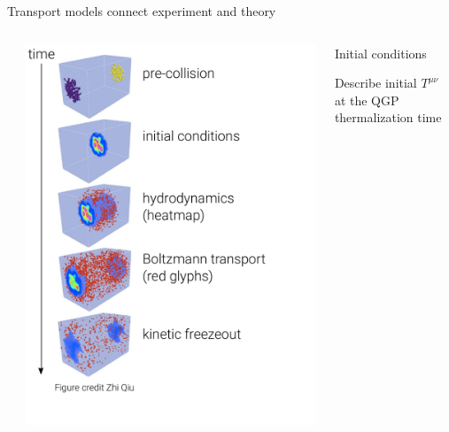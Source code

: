 \documentclass[xcolor=dvipsnames, aspectratio=169]{beamer}
\begin{document}
\begin{frame}[plain]{Transport models connect experiment and theory}
    \bigskip
    \begin{columns}[T]
        \begin{column}{0.05\textwidth}
        \end{column}
        
        \begin{column}{0.4\textwidth}
            \bigskip
            \includegraphics[height=0.9\textheight]{evolution}
        \end{column}
        
        \begin{column}{0.5\textwidth}
            \bigskip
            \begin{block}{\strut \small Initial conditions}
                \footnotesize
                \textcolor{almostblack}{
                Describe initial $T^{\mu\nu}$ 
                at the QGP thermalization time}
            \end{block}
      

\end{column}
\end{columns}
\end{frame}
\end{document}
